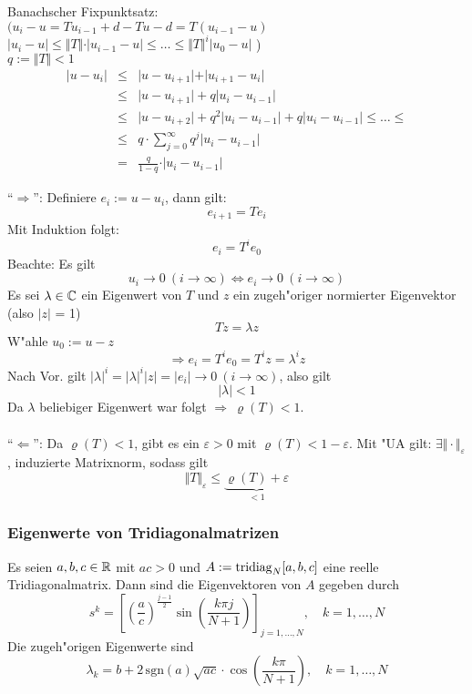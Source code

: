 \documentclass{scrartcl}
\begin{document}
\begin{Bew}
\begin{1aufz}
\item Banachscher Fixpunktsatz: \\
$(u_i - u = Tu_{i-1} + d - Tu - d = T(u_{i-1}-u)$ \\
$\vert u_i - u \vert \leq \Vert T \Vert \cdot \vert u_{i-1} - u \vert \leq \ldots \leq \Vert T \Vert^i \vert u_0 - u \vert$ ) \\
$q := \Vert T \Vert < 1$ \\
\begin{eqnarray*}
\vert u - u_i \vert & \leq & \vert u - u_{i+1} \vert + \vert u_{i+1} - u_i \vert \\
& \leq & \vert u - u_{i+1} \vert + q \vert u_i - u_{i-1} \vert \\
& \leq & \vert u - u_{i+2} \vert + q^2 \vert u_i - u_{i-1} \vert + q \vert u_i - u_{i-1} \vert  \leq \ldots \leq  \\
& \leq & q \cdot \sum\limits_{j=0}^{\infty} q^j \vert u_i - u_{i-1} \vert \\
& = & \frac{q}{1-q} \cdot \vert u_i - u_{i-1} \vert
\end{eqnarray*}
\item "`$\Rightarrow$"': Definiere $e_i := u - u_i$, dann gilt:
$$e_{i+1} = Te_i$$
Mit Induktion folgt:
$$e_i = T^i e_0$$
Beachte: Es gilt
$$u_i \rightarrow 0 \ (i \rightarrow \infty) \Leftrightarrow e_i \rightarrow 0 \ (i \rightarrow \infty)$$
Es sei $\lambda \in \mathbb{C}$ ein Eigenwert von $T$ und $z$ ein zugeh"origer normierter Eigenvektor (also $\vert z \vert$ = 1)
$$Tz = \lambda z$$
W"ahle $u_0 := u - z$
$$\Rightarrow e_i = T^i e_0 = T^i z = \lambda^i z$$
Nach Vor. gilt $\vert \lambda \vert^i = \vert \lambda \vert ^i \vert z \vert = \vert e_i \vert \rightarrow 0 \ (i \rightarrow \infty)$, also gilt
$$\vert \lambda \vert < 1$$
Da $\lambda$ beliebiger Eigenwert war folgt $\Rightarrow \ \varrho(T) < 1$. \\ \\
"`$\Leftarrow$"': Da $\varrho(T) < 1$, gibt es ein $\varepsilon > 0$ mit $\varrho(T) < 1 - \varepsilon$. Mit "UA gilt: $\exists \Vert \cdot \Vert_{\varepsilon}$, induzierte Matrixnorm, sodass gilt
$$\Vert T \Vert_{\varepsilon} \leq \underbrace{\varrho(T) + \varepsilon }_{<1}$$
\end{1aufz}
\end{Bew}

\subsubsection*{Eigenwerte von Tridiagonalmatrizen}
Es seien $a,b,c \in \mathbb{R}$ mit $ac > 0$ und $A := \mathrm{tridiag}_N[a,b,c]$ eine reelle Tridiagonalmatrix. Dann sind die Eigenvektoren von $A$ gegeben durch
$$ s^k = \left[ \left( \frac{a}{c} \right) ^{\frac{j-1}{2}} \sin \left( \frac{ k \pi j}{N + 1} \right) \right]_{j=1,\ldots,N}, \quad k=1, \ldots, N$$
Die zugeh"origen Eigenwerte sind
$$ \lambda_k = b + 2 \, \mathrm{sgn}(a) \sqrt{ac} \cdot \cos \left( \frac{ k \pi }{N+1} \right), \quad k=1,\ldots,N$$
\end{document}
